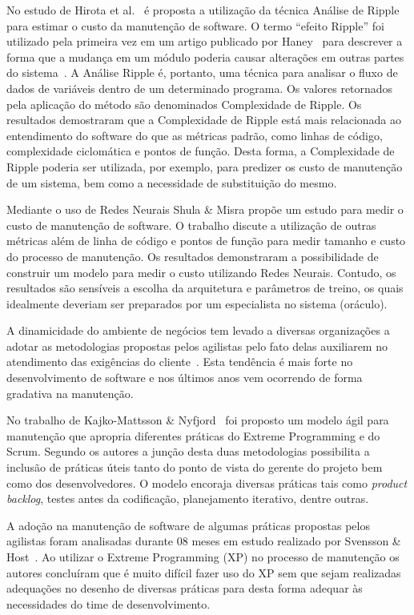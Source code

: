 No estudo de Hirota et al.~\cite{hirota1994approach} é proposta a utilização da
técnica Análise de Ripple para estimar o custo da manutenção de software. O
termo ``efeito Ripple'' foi utilizado pela primeira vez em um artigo publicado
por Haney~\cite{haney1972module} para descrever a forma que a mudança em um
módulo poderia causar alterações em outras partes do
sistema~\cite{bilal2005using}. A Análise Ripple é, portanto, uma técnica para
analisar o fluxo de dados de variáveis dentro de um determinado programa. Os
valores retornados pela aplicação do método são denominados Complexidade de
Ripple. Os resultados demostraram que a Complexidade de Ripple está mais
relacionada ao entendimento do software do que as métricas padrão, como linhas
de código, complexidade ciclomática e pontos de função. Desta forma, a
Complexidade de Ripple poderia ser utilizada, por exemplo, para predizer os
custo de manutenção de um sistema, bem como a necessidade de substituição do
mesmo.

Mediante o uso de Redes Neurais Shula \& Misra
\cite{Shukla:2008:ESM:1342211.1342232} propõe um estudo para medir o custo de
manutenção de software. O trabalho discute a utilização de outras métricas além
de linha de código e pontos de função para medir  tamanho e custo do processo
de manutenção. Os resultados demonstraram a possibilidade de construir um
modelo para medir o custo utilizando Redes Neurais. Contudo, os resultados são
sensíveis a escolha da arquitetura e parâmetros de treino, os quais idealmente
deveriam ser preparados por um especialista no sistema (oráculo).

A dinamicidade do ambiente de negócios tem levado a diversas organizações a
adotar as metodologias propostas pelos agilistas pelo fato delas auxiliarem no
atendimento das exigências do cliente~\cite{Devulapally2015}. Esta tendência é
mais forte no desenvolvimento de software e nos últimos anos vem ocorrendo de
forma gradativa na manutenção. 

No trabalho de Kajko-Mattsson \& Nyfjord~\cite{4755767} foi proposto um modelo
ágil para manutenção que apropria diferentes práticas do Extreme Programming e
do Scrum. Segundo os autores a junção desta duas metodologias possibilita a
inclusão de práticas úteis tanto do ponto de vista do gerente do projeto bem
como dos desenvolvedores. O modelo encoraja diversas práticas tais como
\textit{product backlog}, testes antes da codificação, planejamento iterativo,
dentre outras.

A adoção na manutenção de software de algumas práticas propostas pelos
agilistas foram analisadas durante 08 meses em estudo realizado por Svensson \&
Host~\cite{1402140}. Ao utilizar o Extreme Programming (XP) no processo de
manutenção os autores concluíram que é muito difícil fazer uso do XP sem que
sejam realizadas adequações no desenho de diversas práticas para desta forma
adequar às necessidades do time de desenvolvimento.

